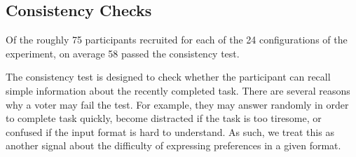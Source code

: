 \documentclass[letterpaper]{article} %
\newcommand{\kibitz}[2]{\ifnum\Comments=1{\color{#1}{#2}}\fi}
\newcommand{\rf}[1]{\kibitz{blue}{[Roy says:#1]}}
\newcommand{\gb}[1]{\kibitz{brown}{[GB:#1]}}
\begin{document}
\subsection{Consistency Checks}

Of the roughly 75 participants  recruited for each of the 24 configurations of the experiment, on average 58 passed the consistency test. 

The consistency test  is designed to check whether the participant can recall simple information about the recently completed task. 
%
There are several reasons why a voter may fail the test. For example, they may answer randomly in order to complete task quickly,  become  distracted  if the task is too tiresome, or confused if the input format is hard to understand. As such, we  treat this as another signal about the difficulty of expressing  preferences in a given format. 







\end{document}
